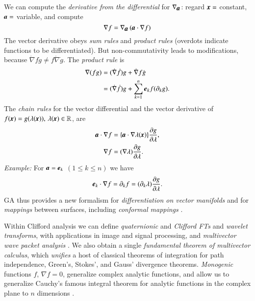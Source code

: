 \documentclass[cameraready]{jcmsi}%
\newcommand{\R}{\mathbb{R}}
\newcommand{\be}{\begin{equation}}
\newcommand{\ee}{\end{equation}}
\newcommand{\vect}[1]{\ensuremath{\mbox{\textbf{\textit{#1}}}}}
\begin{document}
We can compute the \textit{derivative from the differential} 
for $\nabla_{\scriptstyle \vect{a}}$: regard $\vect{x}=$ constant, $\vect{a}=$ variable, and compute
\begin{equation}
\nabla f = \nabla_{\scriptstyle \vect{a}} \,(\vect{a} \cdot \nabla f )
\end{equation}
The vector derivative obeys
\textit{sum rules} and \textit{product rules} (overdots indicate functions to be differentiated). But non-commutativity leads to modifications, because
$\dot{\nabla}f \dot{g} \neq f \dot{\nabla} \dot{g}$. The \textit{product rule} is
\begin{align}
  \nabla (fg)&=(\dot{\nabla}\dot{f} )g + \dot{\nabla}f \dot{g}
  \nonumber \\
  &=(\dot{\nabla}\dot{ f})g + \sum_{k=1}^n \vect{e}_k f ({\partial_k g}).
\end{align}
The \textit{chain rules} for the 
vector differential and the vector derivative 
of $f(\vect{x}) = g(\lambda (\vect{x})), \,\lambda (\vect{x})\in \R$, are
\begin{align}
  \vect{a} \cdot \nabla f 
  &= \{ \vect{a} \cdot \nabla \lambda ( \vect{x} ) \} 
    \frac{\partial g}{\partial{\lambda}},
  \nonumber \\
  \nabla f 
  &= (\nabla\lambda)\frac{\partial g}{\partial \lambda}.
\end{align}
\textit{Example:} 
For $\vect{a}=\vect{e}_k$ $(1\leq k \leq n)$ we have
\be 
  \vect{e}_k \cdot \nabla f
  = \partial_k f 
  = (\partial_k \lambda) \frac{\partial g}{\partial \lambda} .
\ee 
GA thus provides a new formalism for \textit{differentiation on vector manifolds} and for \textit{mappings} between surfaces, including \textit{conformal mappings} \cite{GS:CMinGA}.

Within Clifford analysis we can define \textit{quaternionic} and \textit{Clifford FTs} and \textit{wavelet transforms}, with applications in image and signal processing, and \textit{multivector wave packet analysis} \cite{EH:QFTgen}. We also obtain a single \textit{fundamental theorem of multivector calculus}, which \textit{unifies} a host of classical theorems of integration for path independence, Green's, Stokes', and Gauss' divergence theorems. \textit{Monogenic} functions $f$, $\nabla f = 0$, generalize complex analytic functions, and allow us to generalize Cauchy's famous integral theorem for analytic functions in the complex plane to $n$ dimensions \cite{SS:FThC}. 
\end{document}
